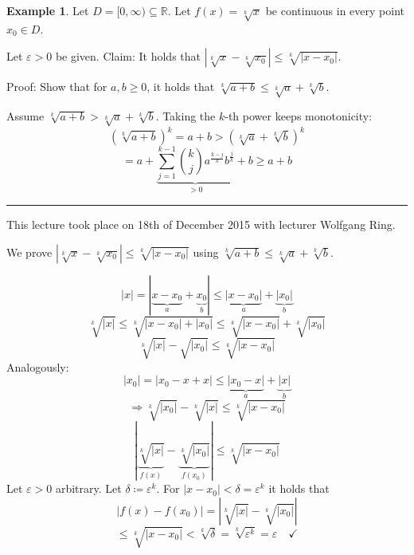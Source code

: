 \documentclass[a4paper,landscape,twocolumn]{article}
\theoremstyle{definition}
\newtheorem{ex}{Example}
\newcommand\abs[1]{\left|#1\right|}
\newcommand\meta[3]{\hrule{} This #1 took place on #2 with lecturer #3.\par}
\begin{document}
\begin{ex}
  Let $D = [0, \infty) \subseteq \mathbb R$.
  Let $f(x) = \sqrt[k]{x}$ be continuous in every point $x_0 \in D$.

  Let $\varepsilon > 0$ be given.
  Claim: It holds that $\abs{\sqrt[k]{x} - \sqrt[k]{x_0}} \leq \sqrt[k]{\abs{x - x_0}}$.

  Proof: Show that for $a,b \geq 0$, it holds that
  $\sqrt[k]{a + b} \leq \sqrt[k]{a} + \sqrt[k]{b}$.

  Assume $\sqrt[k]{a + b} > \sqrt[k]{a} + \sqrt[k]{b}$.
  Taking the $k$-th power keeps monotonicity:
  \[ (\sqrt[k]{a + b})^k = a + b > \left(\sqrt[k]{a} + \sqrt[k]{b}\right)^k \]
  \[ = a + \underbrace{\sum_{j=1}^{k-1} {k \choose j} a^{\frac{k-j}{k}} b^{\frac{j}{k}}}_{>0} + b \geq a + b \]

  \meta{lecture}{18th of December 2015}{Wolfgang Ring}

  We prove $\abs{\sqrt[k]{x} - \sqrt[k]{x_0}} \leq \sqrt[k]{\abs{x - x_0}}$
  using $\sqrt[k]{a + b} \leq \sqrt[k]{a} + \sqrt[k]{b}$.

  \[
    \abs{x}
    = \abs{\underbrace{x - x_0}_{a} + \underbrace{x_0}_{b}}
    \leq \underbrace{\abs{x - x_0}}_{a} + \underbrace{\abs{x_0}}_{b}
  \] \[
    \sqrt[k]{\abs{x}}
    \leq \sqrt[k]{\abs{x - x_0} + \abs{x_0}}
    \leq \sqrt[k]{\abs{x - x_0}} + \sqrt[k]{\abs{x_0}}
  \] \[
    \sqrt[k]{\abs x} - \sqrt{\abs{x_0}} \leq \sqrt[k]{\abs{x - x_0}}
  \]
  Analogously:
  \[ \abs{x_0} = \abs{x_0 - x + x} \leq \underbrace{\abs{x_0 - x}}_{a} + \underbrace{\abs{x}}_{b} \]
  \[ \Rightarrow \sqrt[k]{\abs{x_0}} - \sqrt[k]{\abs x} \leq \sqrt[k]{\abs{x - x_0}} \]
  \[ \abs{\underbrace{\sqrt[k]{\abs x}}_{f(x)} - \underbrace{\sqrt[k]{\abs{x_0}}}_{f(x_0)}} \leq \sqrt[k]{\abs{x - x_0}} \]
  Let $\varepsilon > 0$ arbitrary. Let $\delta \coloneqq \varepsilon^k$.
  For $\abs{x - x_0} < \delta = \varepsilon^k$ it holds that
  \[ \abs{f(x) - f(x_0)} = \abs{\sqrt[k]{\abs x} - \sqrt[k]{\abs{x_0}}} \]
  \[ \leq \sqrt[k]{\abs{x - x_0}} < \sqrt[k]{\delta} = \sqrt[k]{\varepsilon^k} = \varepsilon \quad\checkmark \]
\end{ex}
\end{document}
